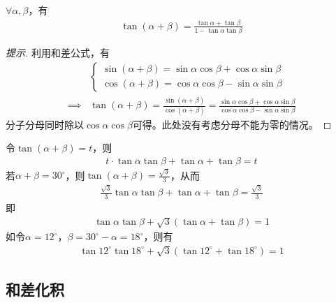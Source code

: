 \begin{theorem}
  $\forall \alpha,\beta$，有
  \begin{align*}
    \tan(\alpha+\beta) = \frac{\tan\alpha+\tan\beta}{1-\tan\alpha\tan\beta}
  \end{align*}
\end{theorem}
\begin{proof}[提示]
  利用和差公式，有
  \begin{align*}
    &\begin{cases}
      \sin(\alpha+\beta) = \sin\alpha\cos\beta + \cos\alpha\sin\beta\\
      \cos(\alpha+\beta) = \cos\alpha\cos\beta - \sin\alpha\sin\beta
    \end{cases}\\
    \implies& \tan(\alpha+\beta)=\frac{\sin(\alpha+\beta)}{\cos(\alpha+\beta)}
              =\frac{\sin\alpha\cos\beta + \cos\alpha\sin\beta}{\cos\alpha\cos\beta - \sin\alpha\sin\beta}
  \end{align*}
  分子分母同时除以$\cos\alpha\cos\beta$可得。此处没有考虑分母不能为零的情况。
\end{proof}

\begin{example}
  令$\tan(\alpha+\beta)=t$，则
  \begin{align*}
    t\cdot\tan\alpha\tan\beta + \tan\alpha + \tan\beta = t
  \end{align*}
  若$\alpha+\beta=30^\circ$，则$\tan(\alpha+\beta) = \frac{\sqrt3}{3}$，从而
  \begin{align*}
    \frac{\sqrt3}{3}\tan\alpha\tan\beta + \tan\alpha + \tan\beta = \frac{\sqrt3}{3}
  \end{align*}
  即
  \begin{align*}
    \tan\alpha\tan\beta + \sqrt3(\tan\alpha + \tan\beta) = 1
  \end{align*}
  如令$\alpha = 12^\circ$，$\beta = 30^\circ - \alpha = 18^\circ$，则有
  \begin{align*}
    \tan12^\circ\tan18^\circ + \sqrt3(\tan12^\circ + \tan18^\circ) = 1
  \end{align*}
\end{example}

\subsection{和差化积}
\label{sec:product-to-sum}

